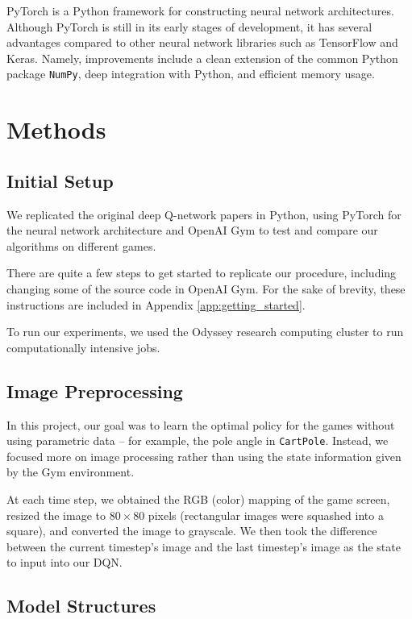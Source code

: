 \documentclass[11pt]{article}
\newcommand{\cp}{\texttt{CartPole}}
\begin{document}
PyTorch \cite{paszke2017pytorch} is a Python framework for constructing neural network architectures. Although PyTorch is still in its early stages of development, it has several advantages compared to other neural network libraries such as TensorFlow and Keras. Namely, improvements include a clean extension of the common Python package \texttt{NumPy}, deep integration with Python, and efficient memory usage. 

\section{Methods}

\subsection{Initial Setup}

We replicated the original deep Q-network papers \cite{mnih2013playing, mnih2015human} in Python, using PyTorch \cite{paszke2017pytorch} for the neural network architecture and OpenAI Gym \cite{brockman2016openai} to test and compare our algorithms on different games. 

There are quite a few steps to get started to replicate our procedure, including changing some of the source code in OpenAI Gym. For the sake of brevity, these instructions are included in Appendix \ref{app:getting_started}.

To run our experiments, we used the Odyssey research computing cluster to run computationally intensive jobs.

\subsection{Image Preprocessing}

In this project, our goal was to learn the optimal policy for the games without using parametric data -- for example, the pole angle in \cp. Instead, we focused more on image processing rather than using the state information given by the Gym environment.

At each time step, we obtained the RGB (color) mapping of the game screen, resized the image to $80 \times 80$ pixels (rectangular images were squashed into a square), and converted the image to grayscale. We then took the difference between the current timestep's image and the last timestep's image as the state to input into our DQN. 

\subsection{Model Structures}
\label{subsec:model_structure}
\end{document}
